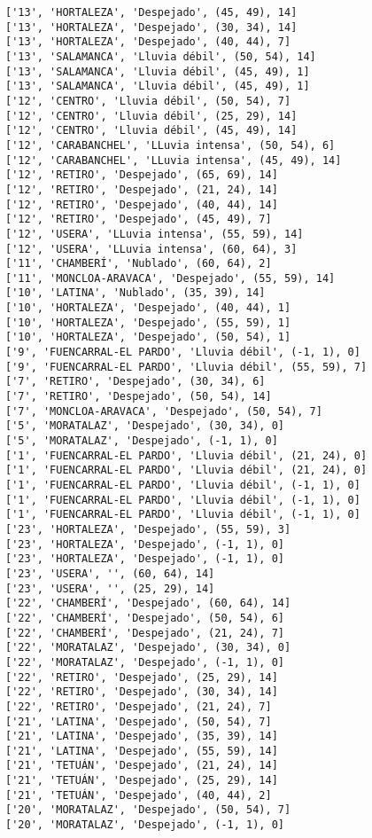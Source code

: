 \documentclass[11pt]{article}
\begin{document}
\begin{Verbatim}[commandchars=\\\{\}]
['13', 'HORTALEZA', 'Despejado', (45, 49), 14]
['13', 'HORTALEZA', 'Despejado', (30, 34), 14]
['13', 'HORTALEZA', 'Despejado', (40, 44), 7]
['13', 'SALAMANCA', 'Lluvia débil', (50, 54), 14]
['13', 'SALAMANCA', 'Lluvia débil', (45, 49), 1]
['13', 'SALAMANCA', 'Lluvia débil', (45, 49), 1]
['12', 'CENTRO', 'Lluvia débil', (50, 54), 7]
['12', 'CENTRO', 'Lluvia débil', (25, 29), 14]
['12', 'CENTRO', 'Lluvia débil', (45, 49), 14]
['12', 'CARABANCHEL', 'LLuvia intensa', (50, 54), 6]
['12', 'CARABANCHEL', 'LLuvia intensa', (45, 49), 14]
['12', 'RETIRO', 'Despejado', (65, 69), 14]
['12', 'RETIRO', 'Despejado', (21, 24), 14]
['12', 'RETIRO', 'Despejado', (40, 44), 14]
['12', 'RETIRO', 'Despejado', (45, 49), 7]
['12', 'USERA', 'LLuvia intensa', (55, 59), 14]
['12', 'USERA', 'LLuvia intensa', (60, 64), 3]
['11', 'CHAMBERÍ', 'Nublado', (60, 64), 2]
['11', 'MONCLOA-ARAVACA', 'Despejado', (55, 59), 14]
['10', 'LATINA', 'Nublado', (35, 39), 14]
['10', 'HORTALEZA', 'Despejado', (40, 44), 1]
['10', 'HORTALEZA', 'Despejado', (55, 59), 1]
['10', 'HORTALEZA', 'Despejado', (50, 54), 1]
['9', 'FUENCARRAL-EL PARDO', 'Lluvia débil', (-1, 1), 0]
['9', 'FUENCARRAL-EL PARDO', 'Lluvia débil', (55, 59), 7]
['7', 'RETIRO', 'Despejado', (30, 34), 6]
['7', 'RETIRO', 'Despejado', (50, 54), 14]
['7', 'MONCLOA-ARAVACA', 'Despejado', (50, 54), 7]
['5', 'MORATALAZ', 'Despejado', (30, 34), 0]
['5', 'MORATALAZ', 'Despejado', (-1, 1), 0]
['1', 'FUENCARRAL-EL PARDO', 'Lluvia débil', (21, 24), 0]
['1', 'FUENCARRAL-EL PARDO', 'Lluvia débil', (21, 24), 0]
['1', 'FUENCARRAL-EL PARDO', 'Lluvia débil', (-1, 1), 0]
['1', 'FUENCARRAL-EL PARDO', 'Lluvia débil', (-1, 1), 0]
['1', 'FUENCARRAL-EL PARDO', 'Lluvia débil', (-1, 1), 0]
['23', 'HORTALEZA', 'Despejado', (55, 59), 3]
['23', 'HORTALEZA', 'Despejado', (-1, 1), 0]
['23', 'HORTALEZA', 'Despejado', (-1, 1), 0]
['23', 'USERA', '', (60, 64), 14]
['23', 'USERA', '', (25, 29), 14]
['22', 'CHAMBERÍ', 'Despejado', (60, 64), 14]
['22', 'CHAMBERÍ', 'Despejado', (50, 54), 6]
['22', 'CHAMBERÍ', 'Despejado', (21, 24), 7]
['22', 'MORATALAZ', 'Despejado', (30, 34), 0]
['22', 'MORATALAZ', 'Despejado', (-1, 1), 0]
['22', 'RETIRO', 'Despejado', (25, 29), 14]
['22', 'RETIRO', 'Despejado', (30, 34), 14]
['22', 'RETIRO', 'Despejado', (21, 24), 7]
['21', 'LATINA', 'Despejado', (50, 54), 7]
['21', 'LATINA', 'Despejado', (35, 39), 14]
['21', 'LATINA', 'Despejado', (55, 59), 14]
['21', 'TETUÁN', 'Despejado', (21, 24), 14]
['21', 'TETUÁN', 'Despejado', (25, 29), 14]
['21', 'TETUÁN', 'Despejado', (40, 44), 2]
['20', 'MORATALAZ', 'Despejado', (50, 54), 7]
['20', 'MORATALAZ', 'Despejado', (-1, 1), 0]

\end{Verbatim}
\end{document}
